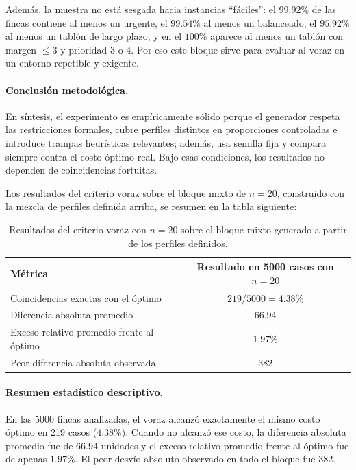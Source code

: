 \documentclass[12pt,a4paper]{article}
\begin{document}
Adem\'as, la muestra no est\'a sesgada hacia instancias ``f\'aciles'': el \(99.92\%\) de las fincas contiene al menos un urgente, el \(99.54\%\) al menos un balanceado, el \(95.92\%\) al menos un tabl\'on de largo plazo, y en el \(100\%\) aparece al menos un tabl\'on con margen \(\le 3\) y prioridad \(3\) o \(4\). Por eso este bloque sirve para evaluar al voraz en un entorno repetible y exigente.

\paragraph{Conclusi\'on metodol\'ogica.}
En s\'intesis, el experimento es emp\'iricamente s\'olido porque el generador respeta las restricciones formales, cubre perfiles distintos en proporciones controladas e introduce trampas heur\'isticas relevantes; adem\'as, usa semilla fija y compara siempre contra el costo \'optimo real. Bajo esas condiciones, los resultados no dependen de coincidencias fortuitas.

Los resultados del criterio voraz sobre el bloque mixto de \(n=20\), construido con la mezcla de perfiles definida arriba, se resumen en la tabla siguiente:

\begin{table}[ht]
  \centering
  \begin{tabular}{lc}
    \toprule
    M\'etrica & Resultado en 5000 casos con \(n=20\) \\
    \midrule
    Coincidencias exactas con el \'optimo & \(219/5000 = 4.38\%\) \\
    Diferencia absoluta promedio & 66.94 \\
    Exceso relativo promedio frente al \'optimo & \(1.97\%\) \\
    Peor diferencia absoluta observada & 382 \\
    \bottomrule
  \end{tabular}
  \caption{Resultados del criterio voraz con \(n=20\) sobre el bloque mixto generado a partir de los perfiles definidos.}
\end{table}

\paragraph{Resumen estad\'istico descriptivo.}
En las 5000 fincas analizadas, el voraz alcanz\'o exactamente el mismo costo \'optimo en 219 casos (\(4.38\%\)). Cuando no alcanz\'o ese costo, la diferencia absoluta promedio fue de 66.94 unidades y el exceso relativo promedio frente al \'optimo fue de apenas \(1.97\%\). El peor desv\'io absoluto observado en todo el bloque fue 382.
\end{document}
